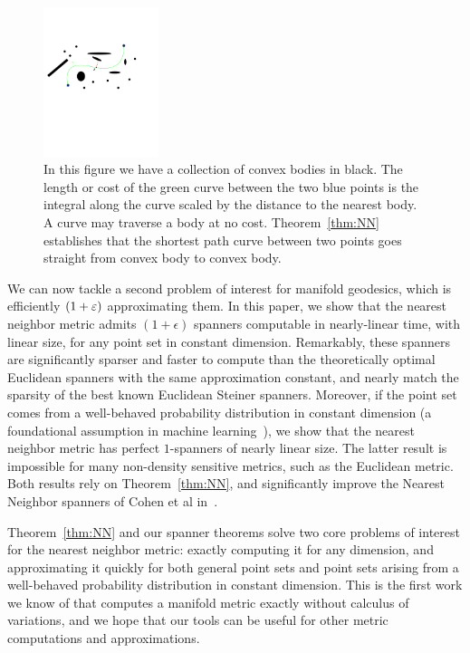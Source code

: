 \begin{enumerate}
\begin{figure}[htbp]
  \centering
    \includegraphics[width=0.3\textwidth]{Figures/example1.pdf}
    \caption{In this figure we have a collection of convex bodies in black.
      The length or cost of the green curve between the two blue points
      is the integral along the curve scaled by the distance to the nearest body.
    A curve may traverse a body at  no cost. Theorem~\ref{thm:NN}
establishes that the shortest path curve between two points goes straight
from convex body to convex body.}
  \label{fig:example}
\end{figure}




\end{enumerate}

We can now tackle a second problem of interest for manifold geodesics,
which is efficiently $(1+\varepsilon)$ approximating them. In this paper, we show
that the nearest neighbor metric admits $(1+\epsilon)$ spanners computable
in nearly-linear time, with linear size, for any point set in constant
dimension. Remarkably, these spanners are significantly sparser and faster
to compute than the theoretically optimal Euclidean spanners with the same
approximation constant, and nearly match the sparsity of the best known
Euclidean Steiner spanners. Moreover, if the point set comes from a
well-behaved probability distribution in constant dimension (a foundational
assumption in machine learning~\cite{}), we show that the nearest neighbor
metric has perfect $1$-spanners of nearly linear size. The latter result is
impossible for many non-density sensitive metrics, such as the Euclidean
metric. Both results rely on Theorem~\ref{thm:NN}, and significantly
improve the Nearest Neighbor spanners of Cohen et al in~\cite{}.

Theorem~\ref{thm:NN} and our spanner theorems solve two core problems of
interest for the nearest neighbor metric: exactly computing it for any
dimension, and approximating it quickly for both general point sets and
point sets arising from a well-behaved probability distribution in constant
dimension. This is the first work we know of that computes a manifold
metric exactly without calculus of variations, and we hope that our tools
can be useful for other metric computations and approximations. 

